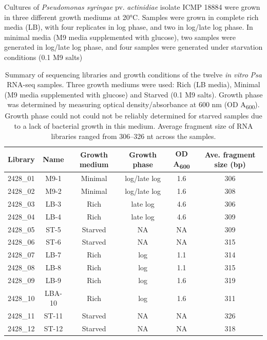 Cultures of \textit{Pseudomonas syringae} pv. \textit{actinidiae} isolate ICMP 18884 were grown in three different growth mediums at 20°C. Samples were grown in complete rich media (LB), with four replicates in log phase, and two in log/late log phase. In minimal media (M9 media supplemented with glucose), two samples were generated in log/late log phase, and four samples were generated under starvation conditions (0.1 M9 salts)
\begin{table}[H]
    \centering
    \footnotesize
    \begin{tabular}{cccccc}\toprule
Library & Name & Growth medium & Growth phase & OD A\textsubscript{600} & Ave. fragment size (bp) \\\midrule
2428_01 & M9-1 & Minimal & log/late log & 1.6 & 306 \\
2428_02 & M9-2 & Minimal & log/late log & 1.6 & 308 \\
2428_03 & LB-3 & Rich & late log & 4.6 & 306 \\
2428_04 & LB-4 & Rich & late log & 4.6 & 309 \\
2428_05 & ST-5 & Starved & NA & NA & 309 \\
2428_06 & ST-6 & Starved & NA & NA & 315 \\
2428_07 & LB-7 & Rich & log & 1.1 & 314 \\ 
2428_08 & LB-8 & Rich & log & 1.1 & 315 \\
2428_09 & LB-9 & Rich & log & 1.6 & 319 \\ 
2428_10 & LBA-10 & Rich & log & 1.6 & 311 \\
2428_11 & ST-11 & Starved & NA & NA & 326 \\
2428_12 & ST-12 & Starved & NA & NA & 318 \\
        \bottomrule
    \end{tabular}
    \caption[Summary of \textit{in vitro} RNA-seq libraries]{Summary of sequencing libraries and growth conditions of the twelve \textit{in vitro} \textit{Psa} RNA-seq samples. Three growth mediums were used: Rich (LB media), Minimal (M9 media supplemented with glucose) and Starved (0.1 M9 salts). Growth phase was determined by measuring optical density/absorbance at 600 nm (OD A\textsubscript{600}). Growth phase could not could not be reliably determined for starved samples due to a lack of bacterial growth in this medium. Average fragment size of RNA libraries ranged from 306--326 nt across the samples. }
        \label{table:in_vitro_sequencing_summary}
\end{table}

